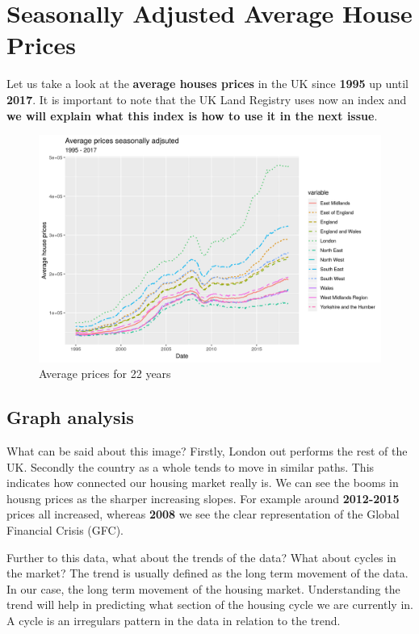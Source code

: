 \documentclass[letterpaper]{scrartcl}
\begin{document}
    \section*{\color{triton_green}Seasonally Adjusted Average House Prices}
        Let us take a look at the \textbf{average houses prices} in the UK since \textbf{1995} up until \textbf{2017}. It is important to note that the UK Land Registry uses now an index and \textbf{we will explain what this index is how to use it in the next issue}. 
        \begin{figure}[H]
            \centering
            \includegraphics[width=\textwidth,keepaspectratio]{DifferentLineTypesSeriesUK.png}
            \caption{Average prices for 22 years}
            \label{fig:SA average prices}
        \end{figure}
    \subsection*{\color{triton_green}Graph analysis}
        What can be said about this image? Firstly, London out performs the rest of the UK. Secondly the country as a whole tends to move in similar paths. This indicates how connected our housing market really is. We can see the booms in housng prices as the sharper increasing slopes. For example around \textbf{2012-2015} prices all increased, whereas \textbf{2008} we see the clear representation of the Global Financial Crisis (GFC). 
        
        Further to this data, what about the trends of the data? What about cycles in the market? The trend is usually defined as the long term movement of the data. In our case, the long term movement of the housing market. Understanding the trend will help in predicting what section of the housing cycle we are currently in. A cycle is an irregulars pattern in the data in relation to the trend. 
\end{document}
